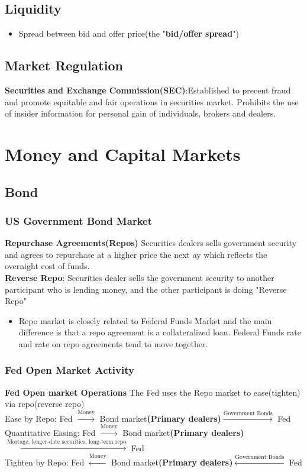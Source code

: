 \documentclass{article}
\theoremstyle{definition}
\theoremstyle{thrm}
\theoremstyle{lma}
\theoremstyle{ppst}
\theoremstyle{crlr}
\begin{document}
\subsection{Liquidity}
\begin{itemize}
	\item Spread between bid and offer price(the "\textbf{bid/offer spread}")
\end{itemize}

\subsection{Market Regulation}
\textbf{Securities and Exchange Commission(SEC)}:Established to precent fraud and promote equitable and fair operations in securities market. Prohibits the use of insider information for personal gain of individuals, brokers and dealers. 

\section{Money and Capital Markets}

\subsection{Bond}
\subsubsection{US Government Bond Market}
\textbf{Repurchase Agreements(Repos)} Securities dealers sells government security and agrees to repurchase at a higher price the next ay which reflects the overnight cost of funds. \\
\textbf{Reverse Repo}: Securities dealer sells the government security to another participant who is lending money, and the other participant is doing "Reverse Repo"
\begin{itemize}
	\item Repo market is closely related to Federal Funds Market and the main difference is that a repo agreement is a collateralized loan. Federal Funds rate and rate on repo agreements tend to move together. 
\end{itemize}

\subsubsection{Fed Open Market Activity}
\textbf{Fed Open market Operations} 
The Fed uses the Repo market to ease(tighten) via repo(reverse repo)\\
Ease by Repo: Fed $\stackrel{\text{Money}}{\longrightarrow}$ Bond market\textbf{(Primary dealers)}$\stackrel{\text{Government Bonds}}{\longrightarrow}$ Fed\\
Quantitative Easing: Fed $\stackrel{\text{Money}}{\longrightarrow}$ Bond market\textbf{(Primary dealers)}$\stackrel{\text{Mortage, longer-date securities, long-term repo}}{\longrightarrow}$ Fed\\
Tighten by Repo: Fed $\stackrel{\text{Money}}{\longleftarrow}$ Bond market\textbf{(Primary dealers)}$\stackrel{\text{Government Bonds}}{\longleftarrow}$ Fed\\
\end{document}
